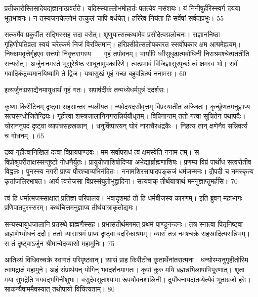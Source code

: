 प्रतीकारोस्तिसादेयद्यज्ञानात्प्रवर्तते।
 यदिस्स्याल्लोभमोहार्तः पतत्येव नसंशयः।
 यं निनीषुर्हरिस्स्वर्ग दयया भूतभावनः।
 न तस्यजनयेल्लोभं तत्कुलं चापि वर्धयेत्।
 हरिरेव नियंता हि सर्वेषां सर्वदाप्रभुः।
 55

  सत्कर्मैव प्रकुर्वीत सद्भिस्सह सदा वसेत्।
 शृणुयात्सत्कथामेव प्रसीदेत्पद्मलोचनः।
 सज्ञाननिष्ठा गृहिणीपतिव्रता स्वयं चरेत्कर्म
निजं विरक्तिमान्।
 हरिप्रसीदेत्सलोपकारत स्सर्वोपकार
क्षम आश्रमेह्ययम्।
 निष्कामवृत्तेर्गृहएव सत्तपो निवृत्तरागस्य
__गृहं तपोवनम्।
 भार्यापि ध्वीसुधृढात्मबोधिनी
निराश्रमश्चेत्पततीति सन्यसेत्।
 अर्जुनःनमस्ते भूसुरेश्रेष्ठ साधूनामुपकारिणे।
 त्वत्प्रभावं विजिज्ञासुरपृच्छं त्वं क्षमस्व भो।
 सर्वं गवादिकंद्रव्यमानयिष्यामि ते द्विज।
 यथासुखं गृहं गच्छ बहुवन्नित्थं ननामसः।
 60

  इत्यर्जुनःप्रसाद्यैनमायुधार्थं गृहं गतः।
 सपार्षदीकं तन्मध्येधर्मपुत्रं ददर्शसः।
 
कृष्णा किरीटिनम् दृष्ट्वा सहसान्तर न्यलीयत।
 न्यवेदयदसौवृत्तम् विप्रस्यातीत लज्जितः।
 कृच्छ्रेणतमनुज्ञाप्य सत्यसन्धोजितेन्द्रियः।
 गृहीत्वा शस्त्रजालानिनगरान्निर्ययौधृतम्।
 विपिनान्तम् ततो गत्वा सूचितेन पथापदैः।
 चोराननुपदं दृष्ट्वा व्यापंचसहस्रकान् ।
 धनुर्विष्पारयन् घोरं नाराचैरधंद्रकैः ।
 निहत्य तान् क्षणेनैव सन्निवर्त्य च गोधनम् ।
 65

  द्रव्यं गृहीत्वानिखिलं दत्वा विप्रायपाण्डवः।
 मम सर्वापराधं त्वं क्षमस्वेति ननाम तम्।
 स विप्रोश्रुपरीताक्षस्सन्तुष्टो गोधनैर्युतः।
 प्रायुयोजाशिषोदिप्या अभेद्यार्ब्राह्मणाशिषः।
 प्रणम्य विप्रं पार्थोध सत्वरोतीव विह्वलः।
 पुनस्स्व नगरी प्राप्य पौरश्चाप्यभिनंदितः।
 ननामशिरसापादपङ्कजं धर्मजन्मनः।
 द्रौपदी च नमस्कृत्य कृतांजलिरभाषत।
 आर्य त्वत्तेजसा विप्रस्संयुतोभूद्वादिना।
 सत्यवाक् तीर्थयात्रार्थ ममनुज्ञाप्तुमर्हसि।
 70

  त्वं हि धर्मात्मजस्साक्षात् प्रतिज्ञा परिपालय।
 भवादृशमहं तो हि धर्मबीजस्य कारणम्।
 इति ब्रुवन् महाभागः प्रणिपातपुरस्सरम्।
 कथंचित्तमनुज्ञाप्य तीर्थयात्राकृतोद्यमः।
 
सन्यस्यायुधजालानि प्रतस्थे ब्राह्मणैस्सह।
 प्रभासतीर्थमगमत् प्रथमं पाण्डुनन्दनः।
 तत्र स्नात्वा पितृनिष्ट्वा ब्राह्मणेभ्योधनं ददौ।
 ततो व्यासाश्रमं प्राप्य दृष्ट्वा बदरिकाश्रमम्।
 व्यासं तत्र नमश्चक्रे सहस्रादित्यसन्निभम्।
 स तं दृष्ट्वाऽर्जुन श्रीमान्वेदव्यासो महामुनिः।
 75

  आतिथ्यं विधिवच्चक्रे स्वागतं परिपृष्टवान्।
 व्यासं प्राह किरीटीच कृतार्थेनांतरात्मना।
 धन्योस्म्यनुगृहीतोस्मि त्वामद्राक्षं महामुने।
 अहं संप्रार्थयन् योगिन् भवदर्शनमागतः।
 कृपां कुरु मयि ब्रह्मन्नभिलाषाभिपूरणात्।
 शृता मया सुभद्रेति भगवद्भगिनीशुभा।
 वसुदेवसुताश्यामा रूपयौवनशालिनी।
 दुर्योधनायदातव्येत्येवं भूताग्रजो हरेः।
 साकन्यैषाममैवस्यात् तथोपायो विचिंत्यताम्।
 80

